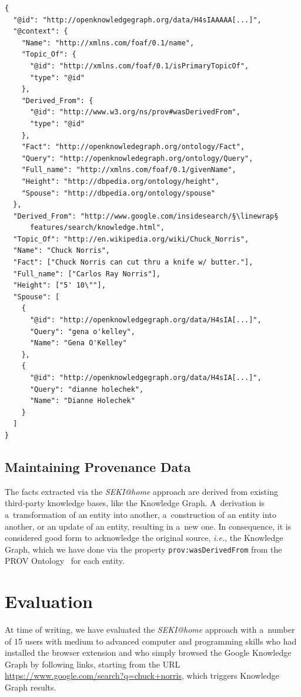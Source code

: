 \documentclass[runningheads,a4paper]{llncs}
\newcommand{\linewrap}{\raisebox{-.6ex}{\textcolor{grey}{$\hookleftarrow$}}}
\begin{document}
\begin{lstlisting}[caption=Subset of the meaningful JSON-LD from the Chuck Norris Knowledge Graph data. The mapping of the Knowledge Graph terms can be seen in the @context., label=code:jsonld, float=hbt!, escapechar=§]
{
  "@id": "http://openknowledgegraph.org/data/H4sIAAAAA[...]",
  "@context": {
    "Name": "http://xmlns.com/foaf/0.1/name",
    "Topic_Of": {
      "@id": "http://xmlns.com/foaf/0.1/isPrimaryTopicOf",
      "type": "@id"
    },
    "Derived_From": {
      "@id": "http://www.w3.org/ns/prov#wasDerivedFrom",
      "type": "@id"
    },
    "Fact": "http://openknowledegraph.org/ontology/Fact",
    "Query": "http://openknowledegraph.org/ontology/Query",
    "Full_name": "http://xmlns.com/foaf/0.1/givenName",
    "Height": "http://dbpedia.org/ontology/height",
    "Spouse": "http://dbpedia.org/ontology/spouse"
  },
  "Derived_From": "http://www.google.com/insidesearch/§\linewrap§
      features/search/knowledge.html",
  "Topic_Of": "http://en.wikipedia.org/wiki/Chuck_Norris",
  "Name": "Chuck Norris",
  "Fact": ["Chuck Norris can cut thru a knife w/ butter."],
  "Full_name": ["Carlos Ray Norris"],
  "Height": ["5' 10\""],
  "Spouse": [
    {
      "@id": "http://openknowledgegraph.org/data/H4sIA[...]",
      "Query": "gena o'kelley",
      "Name": "Gena O'Kelley"
    },
    {
      "@id": "http://openknowledgegraph.org/data/H4sIA[...]",
      "Query": "dianne holechek",
      "Name": "Dianne Holechek"
    }
  ]
}
\end{lstlisting} 

\subsection{Maintaining Provenance Data}
The facts extracted via the \emph{SEKI@home} approach
are derived from existing third-party knowledge bases, like the Knowledge Graph.
A~derivation is a~transformation of an entity into another,
a~construction of an entity into another, or an update of an entity,
resulting in a~new one.
In consequence, it is considered good form to acknowledge the original source,
\emph{i.e.}, the Knowledge Graph,
which we have done via the property \texttt{prov:wasDerivedFrom}
from the PROV Ontology~\cite{lebo2012} for each entity.

\section{Evaluation} \label{sec:evaluation}
At time of writing, we have evaluated the \emph{SEKI@home} approach
with a~number of 15 users
with medium to advanced computer and programming skills
who had installed the browser extension
and who simply browsed the Google Knowledge Graph by following links,
starting from the URL \url{https://www.google.com/search?q=chuck+norris},
which triggers Knowledge Graph results.
\end{document}
